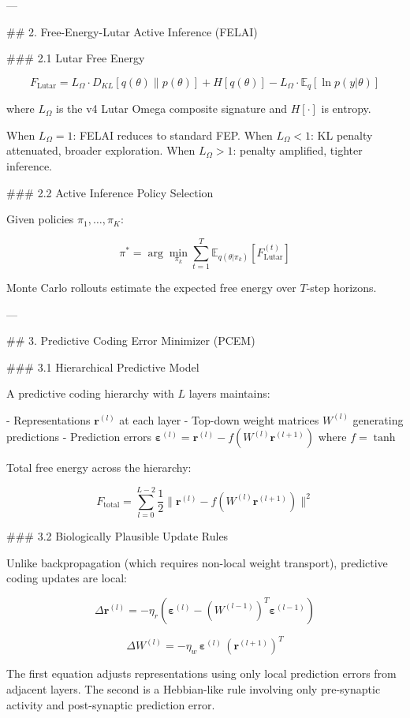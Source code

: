 ---

## 2. Free-Energy-Lutar Active Inference (FELAI)

### 2.1 Lutar Free Energy

\[
F_{\text{Lutar}} = L_\Omega \cdot D_{KL}[q(\theta) \| p(\theta)] + H[q(\theta)] - L_\Omega \cdot \mathbb{E}_q[\ln p(y | \theta)]
\]

where \( L_\Omega \) is the v4 Lutar Omega composite signature and \( H[\cdot] \) is entropy.

When \( L_\Omega = 1 \): FELAI reduces to standard FEP. When \( L_\Omega < 1 \): KL penalty attenuated, broader exploration. When \( L_\Omega > 1 \): penalty amplified, tighter inference.

### 2.2 Active Inference Policy Selection

Given policies \( \pi_1, \ldots, \pi_K \):

\[
\pi^* = \arg\min_{\pi_k} \sum_{t=1}^{T} \mathbb{E}_{q(\theta|\pi_k)}\left[ F_{\text{Lutar}}^{(t)} \right]
\]

Monte Carlo rollouts estimate the expected free energy over \( T \)-step horizons.

---

## 3. Predictive Coding Error Minimizer (PCEM)

### 3.1 Hierarchical Predictive Model

A predictive coding hierarchy with \( L \) layers maintains:

- Representations \( \mathbf{r}^{(l)} \) at each layer
- Top-down weight matrices \( W^{(l)} \) generating predictions
- Prediction errors \( \boldsymbol{\varepsilon}^{(l)} = \mathbf{r}^{(l)} - f(W^{(l)} \mathbf{r}^{(l+1)}) \) where \( f = \tanh \)

Total free energy across the hierarchy:

\[
F_{\text{total}} = \sum_{l=0}^{L-2} \frac{1}{2} \|\mathbf{r}^{(l)} - f(W^{(l)} \mathbf{r}^{(l+1)})\|^2
\]

### 3.2 Biologically Plausible Update Rules

Unlike backpropagation (which requires non-local weight transport), predictive coding updates are local:

\[
\Delta \mathbf{r}^{(l)} = -\eta_r \left( \boldsymbol{\varepsilon}^{(l)} - (W^{(l-1)})^T \boldsymbol{\varepsilon}^{(l-1)} \right)
\]

\[
\Delta W^{(l)} = -\eta_w \, \boldsymbol{\varepsilon}^{(l)} \, (\mathbf{r}^{(l+1)})^T
\]

The first equation adjusts representations using only local prediction errors from adjacent layers. The second is a Hebbian-like rule involving only pre-synaptic activity and post-synaptic prediction error.

